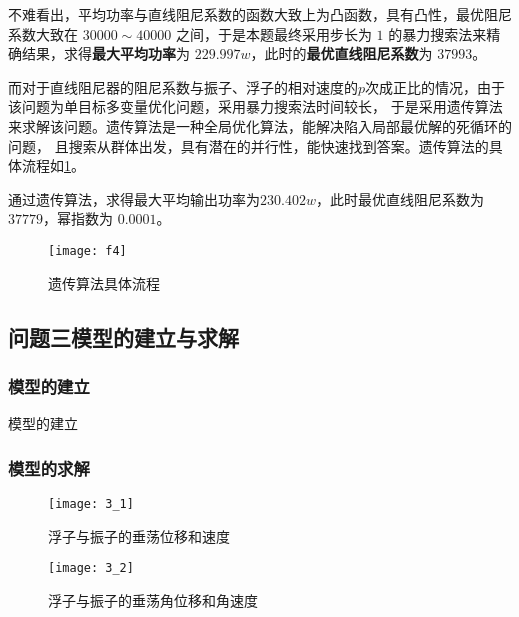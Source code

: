 \documentclass[withoutpreface,bwprint]{cumcmthesis} %
\begin{document}
    不难看出，平均功率与直线阻尼系数的函数大致上为凸函数，具有凸性，最优阻尼系数大致在 $30000 \sim 40000$ 之间，于是本题最终采用步长为 $1$ 的暴力搜索法来精确结果，求得\textbf{最大平均功率}为 $229.997w$，此时的\textbf{最优直线阻尼系数}为 $37993$。

    而对于直线阻尼器的阻尼系数与振子、浮子的相对速度的$p$次成正比的情况，由于该问题为单目标多变量优化问题，采用暴力搜索法时间较长，
    于是采用遗传算法来求解该问题。遗传算法是一种全局优化算法，能解决陷入局部最优解的死循环的问题，
    且搜索从群体出发，具有潜在的并行性，能快速找到答案。遗传算法的具体流程如\cref{fig:GA}。

    通过遗传算法，求得最大平均输出功率为$230.402w$，此时最优直线阻尼系数为$37779$，幂指数为 $0.0001$。

    \begin{figure}[H]
        \centering
        \texttt{[image: f4]}
        \caption{遗传算法具体流程}
        \label{fig:GA}
    \end{figure}
    \subsection{问题三模型的建立与求解}
    \subsubsection{模型的建立}
    模型的建立
    \subsubsection{模型的求解}
    \begin{figure}[H]
        \centering
        \texttt{[image: 3\_1]}
        \caption{浮子与振子的垂荡位移和速度}
        \label{fig:3_1}
    \end{figure}

    \begin{figure}[H]
        \centering
        \texttt{[image: 3\_2]}
        \caption{浮子与振子的垂荡角位移和角速度}
        \label{fig:3_2}
    \end{figure}
\end{document}
